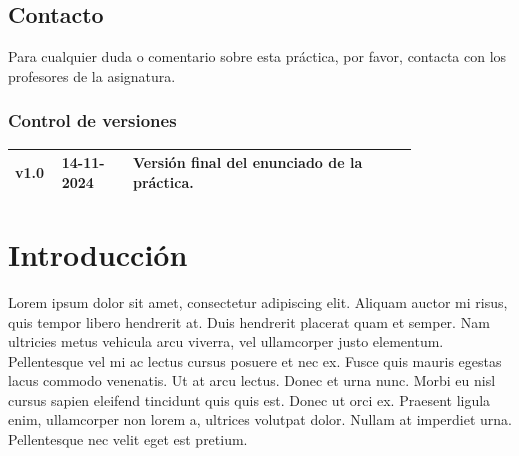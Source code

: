 \documentclass[
    a4paper, %
    12pt, %
]{CSSullivanBusinessReport}
\begin{document}
\begin{twothirdswidth}
    \subsection*{Contacto}
    
    Para cualquier duda o comentario sobre esta práctica, por favor, contacta con los profesores de la asignatura.
    
    \vfill %
    
    \subsubsection*{Control de versiones}
    
    \scriptsize %
    
    \begin{tabular}{@{} L{0.05\linewidth} L{0.15\linewidth} L{0.6\linewidth} @{}} %
        \toprule
        v1.0 & 14-11-2024 & Versión final del enunciado de la práctica.\\
        \bottomrule
    \end{tabular}
\end{twothirdswidth}

\newpage


\begin{twothirdswidth} %
    \tableofcontents %
\end{twothirdswidth}

\newpage


\section{Introducción} %
Lorem ipsum dolor sit amet, consectetur adipiscing elit. Aliquam auctor mi risus, quis tempor libero hendrerit at. Duis hendrerit placerat quam et semper. Nam ultricies metus vehicula arcu viverra, vel ullamcorper justo elementum. Pellentesque vel mi ac lectus cursus posuere et nec ex. Fusce quis mauris egestas lacus commodo venenatis. Ut at arcu lectus. Donec et urna nunc. Morbi eu nisl cursus sapien eleifend tincidunt quis quis est. Donec ut orci ex. Praesent ligula enim, ullamcorper non lorem a, ultrices volutpat dolor. Nullam at imperdiet urna. Pellentesque nec velit eget est pretium.
\end{document}
